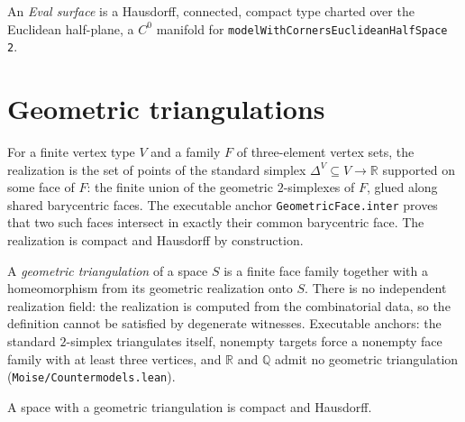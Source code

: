 \begin{definition}
\label{moise:def:eval_surface}
\leanok
An \emph{Eval surface} is a Hausdorff, connected, compact type charted over the
Euclidean half-plane, a $C^0$ manifold for
\texttt{modelWithCornersEuclideanHalfSpace 2}.
\end{definition}

\section{Geometric triangulations}

\begin{definition}
\label{moise:def:geometric_realization}
\leanok
For a finite vertex type $V$ and a family $F$ of three-element vertex sets, the
realization is the set of points of the standard simplex
$\Delta^V\subseteq V\to\mathbb R$ supported on some face of $F$: the finite
union of the geometric $2$-simplexes of $F$, glued along shared barycentric
faces.  The executable anchor
\texttt{GeometricFace.inter} proves that two such faces intersect in exactly
their common barycentric face.  The realization is compact and Hausdorff by
construction.
\end{definition}

\begin{definition}
\label{moise:def:geometric_triangulation}
\leanok
{}
A \emph{geometric triangulation} of a space $S$ is a finite face family
together with a homeomorphism from its geometric realization onto $S$.  There
is no independent realization field: the realization is computed from the
combinatorial data, so the definition cannot be satisfied by degenerate
witnesses.  Executable anchors: the standard $2$-simplex triangulates itself,
nonempty targets force a nonempty face family with at least three vertices,
and $\mathbb R$ and $\mathbb Q$ admit no geometric triangulation
(\texttt{Moise/Countermodels.lean}).
\end{definition}

\begin{lemma}
\label{moise:lem:triangulation_compact}
\leanok
{}
A space with a geometric triangulation is compact and Hausdorff.
\end{lemma}

